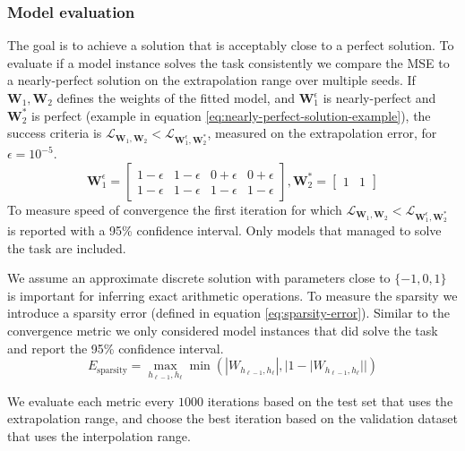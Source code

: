 \subsubsection{Model evaluation}
The goal is to achieve a solution that is acceptably close to a perfect solution. To evaluate if a model instance solves the task consistently we compare the MSE to a nearly-perfect solution on the extrapolation range over multiple seeds. If $\mathbf{W}_1, \mathbf{W}_2$ defines the weights of the fitted model, and $\mathbf{W}_1^\epsilon$ is nearly-perfect and $\mathbf{W}_2^*$ is perfect (example in equation \ref{eq:nearly-perfect-solution-example}), the success criteria is $\mathcal{L}_{\mathbf{W}_1, \mathbf{W}_2} < \mathcal{L}_{\mathbf{W}_1^\epsilon, \mathbf{W}_2^*}$, measured on the extrapolation error, for $\epsilon = 10^{-5}$.
\begin{equation}
    \mathbf{W}_1^\epsilon = \begin{bmatrix}
    1 - \epsilon & 1 - \epsilon & 0 + \epsilon & 0 + \epsilon \\
    1 - \epsilon & 1 - \epsilon & 1 - \epsilon & 1 - \epsilon
    \end{bmatrix}, \mathbf{W}_2^* = \begin{bmatrix}
    1 & 1
    \end{bmatrix}
    \label{eq:nearly-perfect-solution-example}
\end{equation}
To measure speed of convergence the first iteration for which $\mathcal{L}_{\mathbf{W}_1, \mathbf{W}_2} < \mathcal{L}_{\mathbf{W}_1^\epsilon, \mathbf{W}_2^*}$ is reported with a 95\% confidence interval. Only models that managed to solve the task are included.

We assume an approximate discrete solution with parameters close to $\{-1, 0, 1\}$ is important for inferring exact arithmetic operations.
To measure the sparsity we introduce a sparsity error (defined in equation \ref{eq:sparsity-error}).
Similar to the convergence metric we only considered model instances that did solve the task and report the 95\% confidence interval.
\begin{equation}
E_\mathrm{sparsity} = \max_{h_{\ell-1}, h_{\ell}} \min(|W_{h_{\ell-1},h_\ell}|, |1 - |W_{h_{\ell-1},h_\ell}||)
\label{eq:sparsity-error}
\end{equation}

We evaluate each metric every $1000$ iterations based on the test set that uses the extrapolation range, and choose the best iteration based on the validation dataset that uses the interpolation range.


